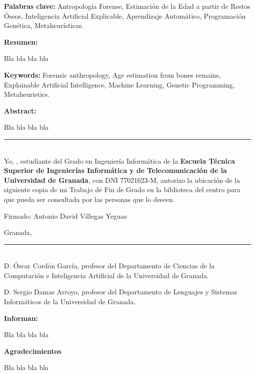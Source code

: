 \clearpage
\begin{center}
	{\large\textbf{\thetitle}}


	\theauthor
\end{center}

\textbf{Palabras clave:} Antropología Forense, Estimación de la Edad a partir de Restos Óseos, Inteligencia Artificial Explicable,
Aprendizaje Automático, Programación Genética, Metaheurísticas.

\textbf{Resumen:}

Bla bla bla bla

\newpage


\begin{center}
	{\large\textbf{\thetitleEN}}


	\theauthor
\end{center}

\textbf{Keywords:} Forensic anthropology, Age estimation from bones remains, Explainable Artificial Intelligence,
Machine Learning, Genetic Programming, Metaheuristics.

\textbf{Abstract:}

Bla bla bla bla

\newpage

\vspace*{2cm}

\rule{\linewidth}{1 mm} \\[1 cm]

{\large Yo, \textbf{\theauthor}, estudiante del Grado en Ingeniería Informática de la \textbf{Escuela Técnica Superior de Ingenierías Informática y de Telecomunicación de la Universidad de Granada}, con DNI 77021623-M, autorizo la ubicación de la siguiente copia de mi Trabajo de Fin de Grado en la biblioteca del centro para que pueda ser consultada por las personas que lo deseen.}

\vspace{7cm}

Firmado: Antonio David Villegas Yeguas

\vspace{2cm}

Granada, \thedate



\newpage

\vspace*{2cm}

\rule{\linewidth}{1 mm} \\[1 cm]

D. Óscar Cordón García, profesor del Departamento de Ciencias de la Computación e Inteligencia Artificial de la Universidad de Granada.

D. Sergio Damas Arroyo, profesor del Departamento de Lenguajes y Sistemas Informáticos de la Universidad de Granada.

\textbf{Informan:}

Bla bla bla bla

\newpage

{\Large \textbf{Agradecimientos}}


Bla bla bla bla
